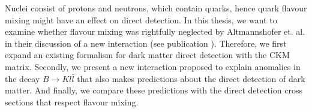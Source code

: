 

Nuclei consist of protons and neutrons, which contain quarks, hence quark flavour mixing might have an effect on direct detection. In this thesis, we want to examine whether flavour mixing was rightfully neglected by Altmannshofer et. al. in their discussion of a new interaction (see publication \cite{Z}). Therefore, we first expand an existing formalism for dark matter direct detection with the CKM matrix. Secondly, we present a new interaction proposed to explain anomalies in the decay $B\rightarrow Kl\bar{l}$ that also makes predictions about the direct detection of dark matter. And finally, we compare these predictions with the direct detection cross sections that respect flavour mixing.


%	
